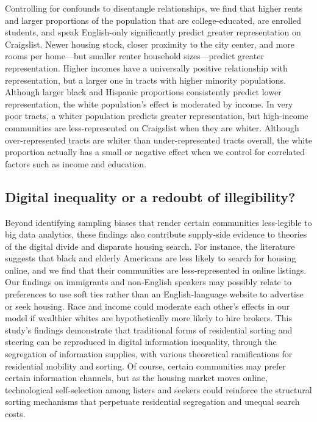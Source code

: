 \documentclass[11pt,letterpaper]{article}
\begin{document}
Controlling for confounds to disentangle relationships, we find that higher rents and larger proportions of the population that are college-educated, are enrolled students, and speak English-only significantly predict greater representation on Craigslist. Newer housing stock, closer proximity to the city center, and more rooms per home---but smaller renter household sizes---predict greater representation. Higher incomes have a universally positive relationship with representation, but a larger one in tracts with higher minority populations. Although larger black and Hispanic proportions consistently predict lower representation, the white population's effect is moderated by income. In very poor tracts, a whiter population predicts greater representation, but high-income communities are less-represented on Craigslist when they are whiter. Although over-represented tracts are whiter than under-represented tracts overall, the white proportion actually has a small or negative effect when we control for correlated factors such as income and education.

\subsection{Digital inequality or a redoubt of illegibility?}

Beyond identifying sampling biases that render certain communities less-legible to big data analytics, these findings also contribute supply-side evidence to theories of the digital divide and disparate housing search. For instance, the literature suggests that black and elderly Americans are less likely to search for housing online, and we find that their communities are less-represented in online listings. Our findings on immigrants and non-English speakers may possibly relate to preferences to use soft ties rather than an English-language website to advertise or seek housing. Race and income could moderate each other's effects in our model if wealthier whites are hypothetically more likely to hire brokers. This study's findings demonstrate that traditional forms of residential sorting and steering can be reproduced in digital information inequality, through the segregation of information supplies, with various theoretical ramifications for residential mobility and sorting. Of course, certain communities may prefer certain information channels, but as the housing market moves online, technological self-selection among listers and seekers could reinforce the structural sorting mechanisms that perpetuate residential segregation and unequal search costs.
\end{document}
